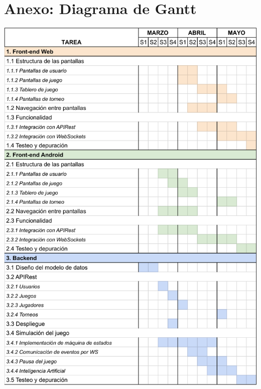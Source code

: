 \documentclass{article}
\begin{document}
\section{Anexo: Diagrama de Gantt} \label{anexo:Gantt}

\includegraphics[width=\textwidth]{../images/diagramaGantt}
\end{document}
